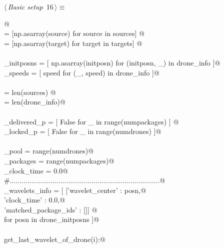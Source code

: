\documentclass[10pt, english, oneside]{report}
\begin{document}
\begin{flushleft} \small
\begin{minipage}{\linewidth}\label{scrap15}\raggedright\small
{} $\langle\,${\itshape Basic setup}\nobreak\ {\footnotesize {16}}$\,\rangle\equiv$
\vspace{-1ex}
\begin{list}{}{} \item
\mbox{}\verb@ @\\
\mbox{}\verb@sources             = [np.asarray(source) for source in sources] @\\
\mbox{}\verb@targets             = [np.asarray(target) for target in targets] @\\
\mbox{}\verb@@\\
\mbox{}\verb@drone_initposns     = [ np.asarray(initposn) for (initposn, _) in drone_info ]@\\
\mbox{}\verb@drone_speeds        = [ speed                for (_,    speed) in drone_info ]@\\
\mbox{}\verb@@\\
\mbox{}\verb@numpackages         = len(sources) @\\
\mbox{}\verb@numdrones           = len(drone_info)@\\
\mbox{}\verb@@\\
\mbox{}\verb@package_delivered_p = [ False for _ in range(numpackages) ] @\\
\mbox{}\verb@drone_locked_p      = [ False for _ in range(numdrones)   ]@\\
\mbox{}\verb@@\\
\mbox{}\verb@drone_pool          = range(numdrones)@\\
\mbox{}\verb@remaining_packages  = range(numpackages)@\\
\mbox{}\verb@global_clock_time   = 0.0@\\
\mbox{}\verb@#.............................................................................@\\
\mbox{}\verb@drone_wavelets_info = [ [{'wavelet_center'        : posn,@\\
\mbox{}\verb@                          'clock_time'            : 0.0,@\\
\mbox{}\verb@                          'matched_package_ids'   : []}] @\\
\mbox{}\verb@                        for posn in drone_initposns ]@\\
\mbox{}\verb@@\\
\mbox{}\verb@def get_last_wavelet_of_drone(i):@\\

\end{list}
\end{minipage}
\end{flushleft}
\end{document}
